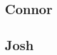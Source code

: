 \documentclass[11pt]{article}
\begin{document}
	\newpage
	
	\subsection{Connor}
	
	
	
	
	\newpage
	
	\subsection{Josh}
	
	


	
\end{document}
